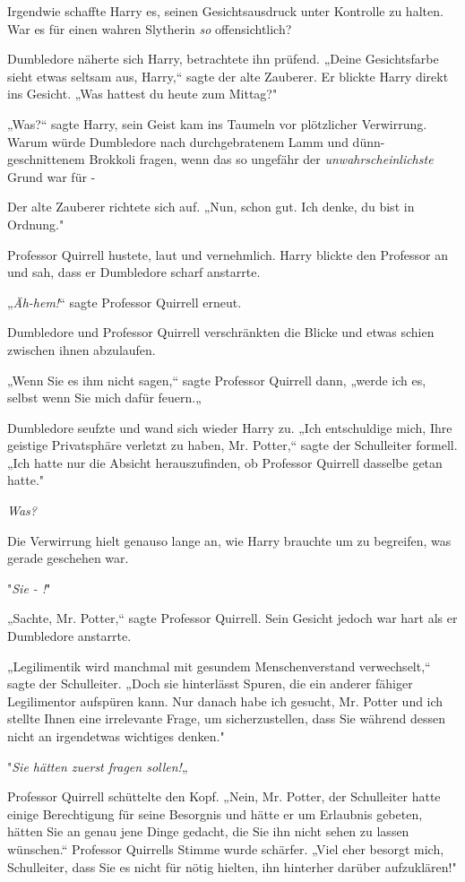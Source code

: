 {Irgendwie schaffte Harry es, seinen Gesichtsausdruck unter Kontrolle zu halten. War es für einen wahren Slytherin \emph{so} offensichtlich?

Dumbledore näherte sich Harry, betrachtete ihn prüfend. „Deine Gesichtsfarbe sieht etwas seltsam aus, Harry,“ sagte der alte Zauberer. Er blickte Harry direkt ins Gesicht. „Was hattest du heute zum Mittag?"

„Was?“ sagte Harry, sein Geist kam ins Taumeln vor plötzlicher Verwirrung. Warum würde Dumbledore nach durchgebratenem Lamm und dünn-geschnittenem Brokkoli fragen, wenn das so ungefähr der \emph{unwahrscheinlichste} Grund war für -

Der alte Zauberer richtete sich auf. „Nun, schon gut. Ich denke, du bist in Ordnung."

Professor Quirrell hustete, laut und vernehmlich. Harry blickte den Professor an und sah, dass er Dumbledore scharf anstarrte.

„\emph{Äh-hem!}“ sagte Professor Quirrell erneut.

Dumbledore und Professor Quirrell verschränkten die Blicke und etwas schien zwischen ihnen abzulaufen.

„Wenn Sie es ihm nicht sagen,“ sagte Professor Quirrell dann, „werde ich es, selbst wenn Sie mich dafür feuern.„

Dumbledore seufzte und wand sich wieder Harry zu. „Ich entschuldige mich, Ihre geistige Privatsphäre verletzt zu haben, Mr. Potter,“ sagte der Schulleiter formell. „Ich hatte nur die Absicht herauszufinden, ob Professor Quirrell dasselbe getan hatte."

\emph{Was?}

Die Verwirrung hielt genauso lange an, wie Harry brauchte um zu begreifen, was gerade geschehen war.

"\emph{Sie - !}"

„Sachte, Mr. Potter,“ sagte Professor Quirrell. Sein Gesicht jedoch war hart als er Dumbledore anstarrte.

„Legilimentik wird manchmal mit gesundem Menschenverstand verwechselt,“ sagte der Schulleiter. „Doch sie hinterlässt Spuren, die ein anderer fähiger Legilimentor aufspüren kann. Nur danach habe ich gesucht, Mr. Potter und ich stellte Ihnen eine irrelevante Frage, um sicherzustellen, dass Sie während dessen nicht an irgendetwas wichtiges denken."

"\emph{Sie hätten zuerst fragen sollen!}„

Professor Quirrell schüttelte den Kopf. „Nein, Mr. Potter, der Schulleiter hatte einige Berechtigung für seine Besorgnis und hätte er um Erlaubnis gebeten, hätten Sie an genau jene Dinge gedacht, die Sie ihn nicht sehen zu lassen wünschen.“ Professor Quirrells Stimme wurde schärfer. „Viel eher besorgt mich, Schulleiter, dass Sie es nicht für nötig hielten, ihn hinterher darüber aufzuklären!"

}
